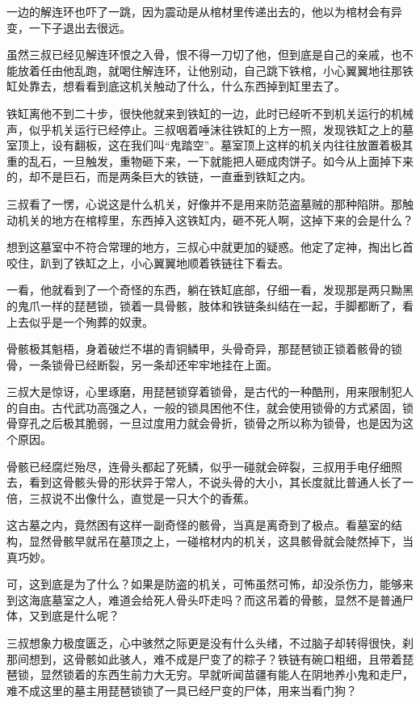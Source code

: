 一边的解连环也吓了一跳，因为震动是从棺材里传递出去的，他以为棺材会有异变，一下子退出去很远。

虽然三叔已经见解连环恨之入骨，恨不得一刀切了他，但到底是自己的亲戚，也不能放着任由他乱跑，就喝住解连环，让他别动，自己跳下铁棺，小心翼翼地往那铁缸处靠去，想看看到底这机关触动了什么，什么东西掉到缸里去了。

铁缸离他不到二十步，很快他就来到铁缸的一边，此时已经听不到机关运行的机械声，似乎机关运行已经停止。三叔咽着唾沫往铁缸的上方一照，发现铁缸之上的墓室顶上，设有翻板，这在我们叫“鬼踏空”。墓室顶上这样的机关内往往放置着极其重的乱石，一旦触发，重物砸下来，一下就能把人砸成肉饼子。如今从上面掉下来的，却不是巨石，而是两条巨大的铁链，一直垂到铁缸之内。

三叔看了一愣，心说这是什么机关，好像并不是用来防范盗墓贼的那种陷阱。那触动机关的地方在棺椁里，东西掉入这铁缸内，砸不死人啊，这掉下来的会是什么？

想到这墓室中不符合常理的地方，三叔心中就更加的疑惑。他定了定神，掏出匕首咬住，趴到了铁缸之上，小心翼翼地顺着铁链往下看去。

一看，他就看到了一个奇怪的东西，躺在铁缸底部，仔细一看，发现那是两只黝黑的鬼爪一样的琵琶锁，锁着一具骨骸，肢体和铁链条纠结在一起，手脚都断了，看上去似乎是一个殉葬的奴隶。

骨骸极其魁梧，身着破烂不堪的青铜鳞甲，头骨奇异，那琵琶锁正锁着骸骨的锁骨，一条锁骨已经断裂，另一条却还牢牢地挂在上面。

三叔大是惊讶，心里琢磨，用琵琶锁穿着锁骨，是古代的一种酷刑，用来限制犯人的自由。古代武功高强之人，一般的锁具困他不住，就会使用锁骨的方式紧固，锁骨穿孔之后极其脆弱，一旦过度用力就会骨折，锁骨之所以称为锁骨，也是因为这个原因。

骨骸已经腐烂殆尽，连骨头都起了死鳞，似乎一碰就会碎裂，三叔用手电仔细照去，看到这骨骸头骨的形状异于常人，不说头骨的大小，其长度就比普通人长了一倍，三叔说不出像什么，直觉是一只大个的香蕉。

这古墓之内，竟然困有这样一副奇怪的骸骨，当真是离奇到了极点。看墓室的结构，显然骨骸早就吊在墓顶之上，一碰棺材内的机关，这具骸骨就会陡然掉下，当真巧妙。

可，这到底是为了什么？如果是防盗的机关，可怖虽然可怖，却没杀伤力，能够来到这海底墓室之人，难道会给死人骨头吓走吗？而这吊着的骨骸，显然不是普通尸体，又到底是什么呢？

三叔想象力极度匮乏，心中骇然之际更是没有什么头绪，不过脑子却转得很快，刹那间想到，这骨骸如此骇人，难不成是尸变了的粽子？铁链有碗口粗细，且带着琵琶锁，显然锁着的东西生前力大无穷。早就听闻苗疆有能人在阴地养小鬼和走尸，难不成这里的墓主用琵琶锁锁了一具已经尸变的尸体，用来当看门狗？

